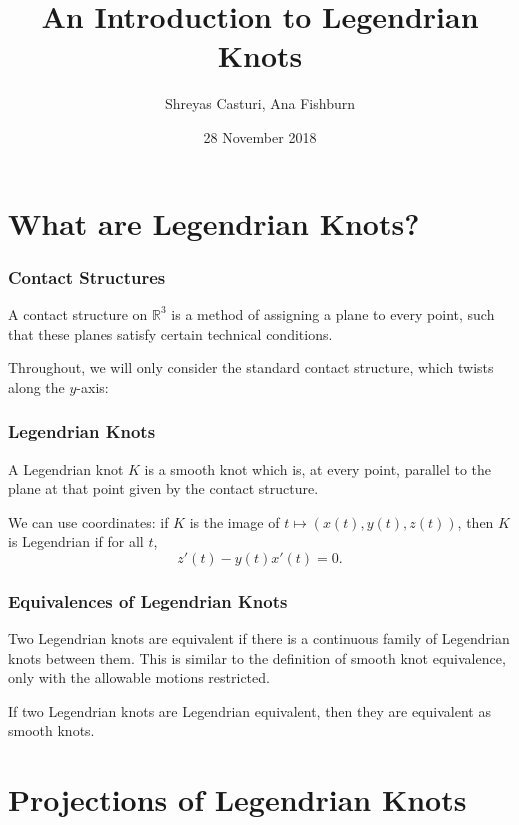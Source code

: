 \documentclass{beamer}
\newcommand{\R}{\mathbb{R}}
\begin{document}
\title{An Introduction to Legendrian Knots}
\author{Shreyas Casturi, Ana Fishburn}
\date{28 November 2018}

\frame{\titlepage}

\section[Intro]{What are Legendrian Knots?}

\begin{frame}
    \frametitle{Contact Structures}
    \begin{definition}
    A \alert{contact structure} on $\R^3$ is a method of assigning a plane
    to every point, such that these planes satisfy certain technical conditions.
    \end{definition}

    Throughout, we will only consider the \alert{standard contact structure}, which
    twists along the $y$-axis:
\end{frame}

\begin{frame}
\frametitle{Legendrian Knots}
    \begin{definition}
    A \alert{Legendrian knot} $K$ is a smooth knot which is, at every point, parallel to the
    plane at that point given by the contact structure.
    \end{definition}

    We can use coordinates: if $K$ is the image of $t \mapsto (x(t),y(t),z(t))$, then $K$
    is Legendrian if for all $t$,
    \[ z'(t) - y(t)x'(t) = 0. \]
\end{frame}

\begin{frame}
    \frametitle{Equivalences of Legendrian Knots}
    Two Legendrian knots are equivalent if there is a continuous family of Legendrian
    knots between them. This is similar to the definition of smooth knot equivalence,
    only with the allowable motions restricted.

    \begin{theorem}
    If two Legendrian knots are Legendrian equivalent, then they are equivalent as smooth knots.
    \end{theorem}
\end{frame}

\section[Proj]{Projections of Legendrian Knots}
\end{document}
